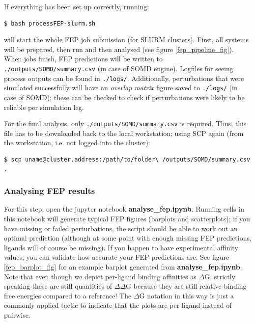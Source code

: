 If everything has been set up correctly, running:

\begin{lstlisting}
$ bash processFEP-slurm.sh
\end{lstlisting}

will start the whole FEP job submission (for SLURM clusters). First, all systems will be
prepared, then run and then analysed (see figure \ref{fep_pipeline_fig}). When jobs finish, FEP predictions will be written to \texttt{./outputs/SOMD/summary.csv} (in case of SOMD
engine). Logfiles for seeing process outputs can be found in
\texttt{./logs/}. Additionally, perturbations that were simulated
successfully will have an \emph{overlap matrix} figure saved to
\texttt{./logs/} (in case of SOMD); these can be checked to check if perturbations were likely to be reliable per simulation leg. \cite{mey2020best}

For the final analysis, only \texttt{./outputs/SOMD/summary.csv} is required. Thus, this file has to be downloaded back to the local workstation; using SCP again (from the workstation, i.e. not logged into the cluster):

\begin{lstlisting}
$ scp uname@cluster.address:/path/to/folder\ /outputs/SOMD/summary.csv .
\end{lstlisting}


\subsubsection{Analysing FEP results}

For this step, open the jupyter notebook \textbf{analyse\_fep.ipynb}.
Running cells in this notebook will generate typical FEP figures
(barplots and scatterplots); if you have missing or failed
perturbations, the script should be able to work out an optimal
prediction (although at some point with enough missing FEP predictions,
ligands will of course be missing). If you happen to have experimental
affinity values, you can validate how accurate your FEP predictions are. See figure \ref{fep_barplot_fig} for an example barplot generated from \textbf{analyse\_fep.ipynb}. Note that even though we depict per-ligand binding affinities as $\Delta$G, strictly speaking these are still quantities of $\Delta\Delta$G because they are still relative binding free energies compared to a reference! The $\Delta$G notation in this way is just a commonly applied tactic to indicate that the plots are per-ligand instead of pairwise.

